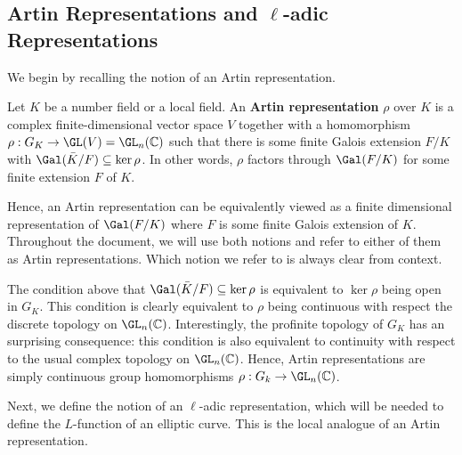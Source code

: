 \subsection{Artin Representations and  \texorpdfstring{$\ell$}{TEXT}-adic Representations} \label{subsection_reps}

We begin by recalling the notion of an Artin representation.

\begin{defn}
    Let $K$ be a number field or a local field. An \textbf{Artin representation} $\rho$ over $K$ is a complex finite-dimensional vector space $V$ together with a homomorphism $\rho:G_K\to\GL(V)=\GL_n(\CC)$ such that there is some finite Galois extension $F/K$ with $\Gal(\bar{K}/F)\subseteq\ker\rho$. In other words, $\rho$ factors through $\Gal(F/K)$ for some finite extension $F$ of $K$.
\end{defn}

Hence, an Artin representation can be equivalently viewed as a finite dimensional representation of $\Gal(F/K)$ where $F$ is some finite Galois extension of $K$. Throughout the document, we will use both notions and refer to either of them as Artin representations. Which notion we refer to is always clear from context.

\begin{rem}
    The condition above that $\Gal(\bar{K}/F)\subseteq\ker\rho$ is equivalent to $\ker\rho$ being open in $G_K$. This condition is clearly equivalent to $\rho$ being continuous with respect the discrete topology on $\GL_n(\CC)$. Interestingly, the profinite topology of $G_K$ has an surprising consequence: this condition is also equivalent to continuity with respect to the usual complex topology on $\GL_n(\CC)$. 
    Hence, Artin representations are simply continuous group homomorphisms $\rho:G_k\to\GL_n(\CC)$.
\end{rem}

Next, we define the notion of an $\ell$-adic representation, which will be needed to define the $L$-function of an elliptic curve. This is the local analogue of an Artin representation.

